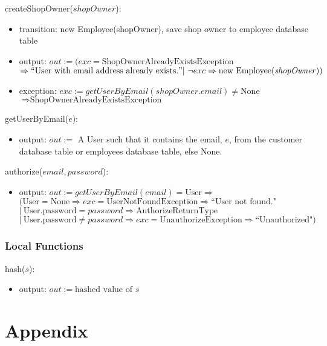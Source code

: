 \documentclass[12pt, titlepage]{article}
\begin{document}
\noindent createShopOwner($shopOwner$):
\begin{itemize}
	\item transition: new Employee(shopOwner), save shop owner to employee database table
	\item output: $out := (exc = \text{ShopOwnerAlreadyExistsException}$ \\ $\Rightarrow ``\text{User with
			      email address already exists.}" |\ \neg exc \Rightarrow \text{new Employee(\emph{shopOwner})})$
	\item exception: $exc := getUserByEmail(shopOwner.email) \neq \text{None}$ \\ $\Rightarrow
		      \text{ShopOwnerAlreadyExistsException}$
\end{itemize}

\noindent getUserByEmail($e$):
\begin{itemize}
	\item output: $out :=$ A User such that it contains the email, $e$, from the customer database table or
	      employees database table, else None.
\end{itemize}

\noindent authorize($email, password$):
\begin{itemize}
	\item output: $out := getUserByEmail(email) = \text{User} \Rightarrow $ \\ $(\text{User} = \text{None}
		      \Rightarrow exc = \text{UserNotFoundException} \Rightarrow \text{``User not found."}$ \\ $|\
		      \text{User.password} = password \Rightarrow \text{AuthorizeReturnType}$ \\ $|\ \text{User.password}
		      \neq password \Rightarrow exc = \text{UnauthorizeException} \Rightarrow \text{``Unauthorized"})$
\end{itemize}

\subsubsection{Local Functions}

\noindent hash($s$):
\begin{itemize}
	\item output: $out := \text{hashed value of } s$
\end{itemize}

\newpage




\newpage

\section{Appendix}

\end{document}
